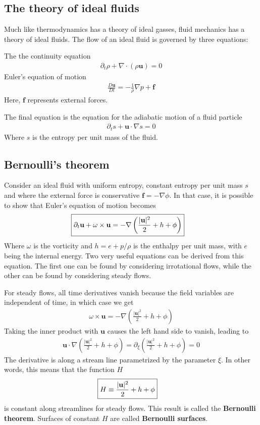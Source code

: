\documentclass[a4paper, 12pt]{article}
\numberwithin{equation}{subsubsection}
\begin{document}
\subsection{The theory of ideal fluids}
Much like thermodynamics has a theory of ideal gasses, fluid mechanics has a theory of ideal fluids. The flow of an ideal fluid is governed by three equations:

The the continuity equation
\begin{align}
	\partial_t \rho + \nabla \cdot (\rho \mathbf{u}) = 0
\end{align}
Euler's equation of motion
\begin{align}
	\frac{D \mathbf{u}}{D t} = - \frac{1}{\rho} \nabla p + \mathbf{f}
\end{align}
Here, $\mathbf{f}$ represents external forces.

The final equation is the equation for the adiabatic motion of a fluid particle
\begin{align}
	\partial_t s + \mathbf{u} \cdot \nabla s = 0
\end{align}
Where $s$ is the entropy per unit mass of the fluid.

\subsection{Bernoulli's theorem}
Consider an ideal fluid with uniform entropy, constant entropy per unit mass $s$ and where the external force is conservative $\mathbf{f} = - \nabla \phi$. In that case, it is possible to show that Euler's equation of motion becomes
\begin{align}
	\Aboxed{ \partial_t \mathbf{u} + \omega \times \mathbf{u} = - \nabla \left( \frac{|\mathbf{u}|^2}{2} + h + \phi \right) }
\end{align}
Where $\omega$ is the vorticity and $h = e + p/\rho$ is the enthalpy per unit mass, with $e$ being the internal energy. Two very useful equations can be derived from this equation. The first one can be found by considering irrotational flows, while the other can be found by considering steady flows.

For steady flows, all time derivatives vanish because the field variables are independent of time, in which case we get
\begin{align}
	\omega \times \mathbf{u} = - \nabla \left( \frac{|\mathbf{u}|^2}{2} + h + \phi \right)
\end{align}
Taking the inner product with $\mathbf{u}$ causes the left hand side to vanish, leading to
\begin{align}
	\mathbf{u} \cdot \nabla \left( \frac{|\mathbf{u}|^2}{2} + h + \phi \right) = \partial_\xi  \left( \frac{|\mathbf{u}|^2}{2} + h + \phi \right) = 0
\end{align}
The derivative is along a stream line parametrized by the parameter $\xi$. In other words, this means that the function $H$
\begin{align}
	\Aboxed{ H \equiv \frac{|\mathbf{u}|^2}{2} + h + \phi } \label{eq:bernoulli_theorem}
\end{align}
is constant along streamlines for steady flows. This result is called the \textbf{Bernoulli theorem}. Surfaces of constant $H$ are called \textbf{Bernoulli surfaces}.
\end{document}
